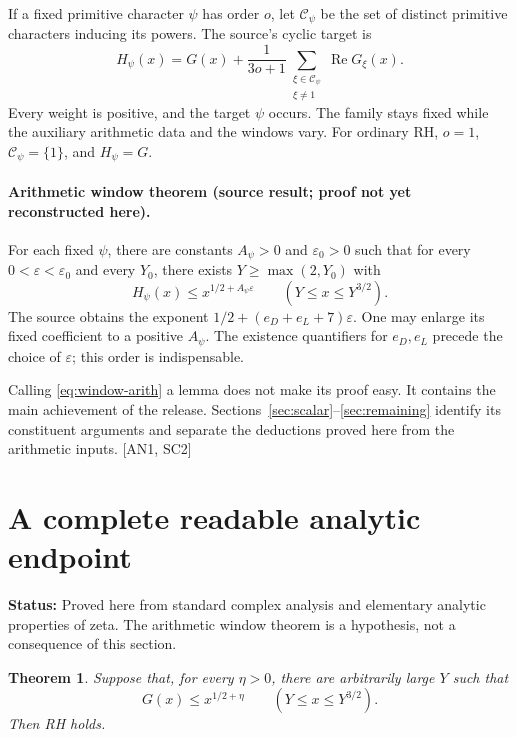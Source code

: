 \documentclass[11pt,a4paper]{article}
\numberwithin{equation}{section}
\newtheorem{theorem}{Theorem}[section]
\theoremstyle{remark}\newtheorem{remark}[theorem]{Remark}
\newcommand{\Rea}{\operatorname{Re}}
\newcommand{\status}[1]{\textbf{Status:} #1}
\begin{document}
If a fixed primitive character $\psi$ has order $o$, let $\mathcal C_\psi$ be the set of distinct primitive characters inducing its powers. The source's cyclic target is
\begin{equation}\label{eq:Hpsi}
H_\psi(x)=G(x)+\frac{1}{3o+1}
                   \sum_{\substack{\xi\in\mathcal C_\psi\\\xi\ne1}}\Rea G_\xi(x).
\end{equation}
Every weight is positive, and the target $\psi$ occurs. The family stays fixed while the auxiliary arithmetic data and the windows vary. For ordinary RH, $o=1$, $\mathcal C_\psi=\{1\}$, and $H_\psi=G$.

\paragraph{Arithmetic window theorem (source result; proof not yet reconstructed here).}
For each fixed $\psi$, there are constants $A_\psi>0$ and $\varepsilon_0>0$ such that for every $0<\varepsilon<\varepsilon_0$ and every $Y_0$, there exists $Y\ge\max(2,Y_0)$ with
\begin{equation}\label{eq:window-arith}
H_\psi(x)\le x^{1/2+A_\psi\varepsilon}
                    \qquad(Y\le x\le Y^{3/2}).
\end{equation}
The source obtains the exponent $1/2+(e_D+e_L+7)\varepsilon$. One may enlarge its fixed coefficient to a positive $A_\psi$. The existence quantifiers for $e_D,e_L$ precede the choice of $\varepsilon$; this order is indispensable.\cite{coregm,topwin,conclusion}

Calling \eqref{eq:window-arith} a lemma does not make its proof easy. It contains the main achievement of the release. Sections~\ref{sec:scalar}--\ref{sec:remaining} identify its constituent arguments and separate the deductions proved here from the arithmetic inputs. \textsf{[AN1, SC2]}

\section{A complete readable analytic endpoint}\label{sec:analytic}

\status{Proved here from standard complex analysis and elementary analytic properties of zeta. The arithmetic window theorem is a hypothesis, not a consequence of this section.}

\begin{theorem}\label{thm:ordinary}
Suppose that, for every $\eta>0$, there are arbitrarily large $Y$ such that
\begin{equation}\label{eq:ordinary-window}
G(x)\le x^{1/2+\eta}\qquad(Y\le x\le Y^{3/2}).
\end{equation}
Then RH holds.
\end{theorem}
\end{document}
